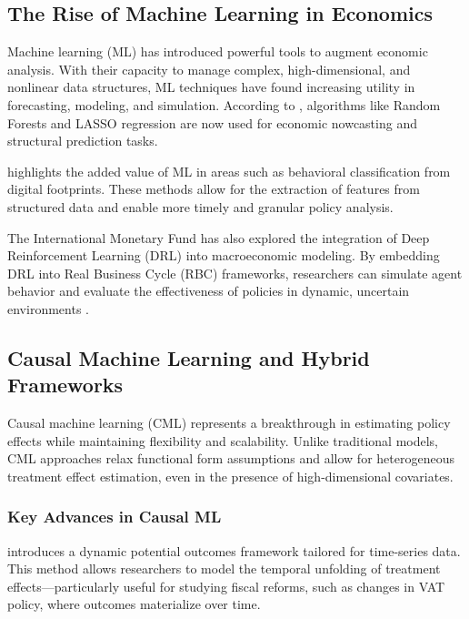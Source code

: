 \subsection{The Rise of Machine Learning in Economics}\label{subsec:ml_economics}

Machine learning (ML) has introduced powerful tools to augment economic analysis. With their capacity to manage complex, high-dimensional, and nonlinear data structures, ML techniques have found increasing utility in forecasting, modeling, and simulation. According to \citet{bankofcanada2023ml}, algorithms like Random Forests and LASSO regression are now used for economic nowcasting and structural prediction tasks.

\citet{sekhansen2023mlpolicy} highlights the added value of ML in areas such as behavioral classification from digital footprints. These methods allow for the extraction of features from structured data and enable more timely and granular policy analysis.

The International Monetary Fund has also explored the integration of Deep Reinforcement Learning (DRL) into macroeconomic modeling. By embedding DRL into Real Business Cycle (RBC) frameworks, researchers can simulate agent behavior and evaluate the effectiveness of policies in dynamic, uncertain environments \citep{imf2023ai}.

\subsection{Causal Machine Learning and Hybrid Frameworks}\label{subsec:cml_hybrid}

Causal machine learning (CML) represents a breakthrough in estimating policy effects while maintaining flexibility and scalability. Unlike traditional models, CML approaches relax functional form assumptions and allow for heterogeneous treatment effect estimation, even in the presence of high-dimensional covariates.

\subsubsection{Key Advances in Causal ML}\label{subsubsec:advances}

\citet{shephard2023nonparametric} introduces a dynamic potential outcomes framework tailored for time-series data. This method allows researchers to model the temporal unfolding of treatment effects—particularly useful for studying fiscal reforms, such as changes in VAT policy, where outcomes materialize over time.


